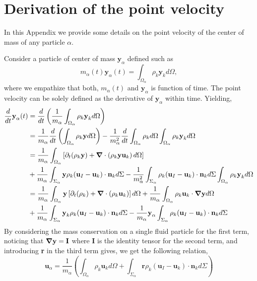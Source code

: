 \section{Derivation of the point velocity}
\label{ap:velocity_definition}
In this Appendix we provide some details on the point velocity of the center of mass of any particle $\alpha$. 

Consider a particle of center of mass $\textbf{y}_\alpha$ defined such as
\begin{equation*}
    m_\alpha(t) \textbf{y}_\alpha(t)
    = \int_{\Omega_\alpha} \rho_k \textbf{y}_k d\Omega,
\end{equation*}
where we empathize that both, $m_\alpha(t)$ and $\textbf{y}_\alpha$ is function of time. 
The point velocity can be solely defined as the derivative of $\textbf{y}_\alpha$ within time.
Yielding, 
\begin{align*}
    \frac{d}{d t} \textbf{y}_\alpha (t)
    &=
    \frac{d}{d t} \left(
        \frac{1}{m_\alpha} \int_{\Omega_\alpha} \rho_k \textbf{y}_k d\Omega
    \right)\\
    &= \frac{1}{m_\alpha}
    \frac{d}{d t} 
    \left(
        \int_{\Omega_\alpha} \rho_k \textbf{y} d\Omega
    \right)
    - \frac{1}{m_\alpha^2} \frac{d}{d t} \int_{\Omega_\alpha} \rho_k d\Omega \int_{\Omega_\alpha} \rho_k \textbf{y}_k d\Omega
    \\
    &= \frac{1}{m_\alpha}\int_{\Omega_\alpha} \left[
        \partial_t (\rho_k \textbf{y}) + \bm{\nabla} \cdot\left(\rho_k \textbf{y}\textbf{u}_k\right) d\Omega 
    \right]\\
    &+ \frac{1}{m_\alpha}\int_{\Sigma_\alpha} \textbf{y} \rho_k(\textbf{u}_I   - \textbf{u}_k) \cdot \textbf{n}_k d \Sigma
    -  \frac{1}{m_\alpha^2} \int_{\Sigma_\alpha} \rho_k(\textbf{u}_I   - \textbf{u}_k) \cdot \textbf{n}_k d\Sigma  \int_{\Omega_\alpha} \rho_k \textbf{y}_k d\Omega
    \\
    &= \frac{1}{m_\alpha}\int_{\Omega_\alpha} \textbf{y} \left[
    \partial_t (\rho_k) + \bm{\nabla} \cdot\left(\rho_k \textbf{u}_k\right) 
    \right]d\Omega
    + \frac{1}{m_\alpha}\int_{\Omega_\alpha} \rho_k  \textbf{u}_k  \cdot \bm{\nabla} \textbf{y} d\Omega \\
    &+ \frac{1}{m_\alpha}\int_{\Sigma_\alpha} \textbf{y}_k \rho_k (\textbf{u}_I - \textbf{u}_k) \cdot \textbf{n}_k d \Sigma
    - \frac{1}{m_\alpha}  \textbf{y}_\alpha \int_{\Sigma_\alpha} \rho_k(\textbf{u}_I   - \textbf{u}_k) \cdot \textbf{n}_k d\Sigma
\end{align*}
By considering the mass conservation on a single fluid particle for the first term, noticing that $\bm{\nabla} \textbf{y} = \textbf{I}$ where $\textbf{I}$ is the identity tensor for the second term, and introducing \textbf{r} in the third term gives, we get the following relation,
\begin{equation*}
    \textbf{u}_\alpha
    = \frac{1}{m_\alpha} \left(
        \int_{\Omega_\alpha} \rho_k \textbf{u}_k d\Omega
        +  \int_{\Sigma_\alpha} \textbf{r} \rho_k (\textbf{u}_I - \textbf{u}_k) \cdot \textbf{n}_k d\Sigma
    \right)
\end{equation*}


